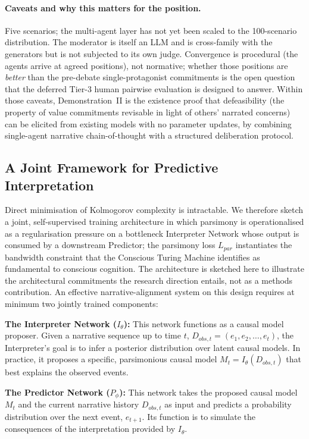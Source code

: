 \documentclass{article}
\theoremstyle{plain}
\theoremstyle{definition}
\theoremstyle{remark}
\begin{document}
\paragraph{Caveats and why this matters for the position.} Five scenarios; the multi-agent layer has not yet been scaled to the 100-scenario distribution. The moderator is itself an LLM and is cross-family with the generators but is not subjected to its own judge. Convergence is procedural (the agents arrive at agreed positions), not normative; whether those positions are \emph{better} than the pre-debate single-protagonist commitments is the open question that the deferred Tier-3 human pairwise evaluation is designed to answer. Within those caveats, Demonstration~II is the existence proof that defeasibility (the property of value commitments revisable in light of others' narrated concerns) can be elicited from existing models with no parameter updates, by combining single-agent narrative chain-of-thought with a structured deliberation protocol.

\subsection{A Joint Framework for Predictive Interpretation}
\label{sec:joint}

Direct minimisation of Kolmogorov complexity is intractable. We therefore sketch a joint, self-supervised training architecture in which parsimony is operationalised as a regularisation pressure on a bottleneck Interpreter Network whose output is consumed by a downstream Predictor; the parsimony loss $L_{par}$ instantiates the bandwidth constraint that the Conscious Turing Machine \citep{blum22, blum24} identifies as fundamental to conscious cognition. The architecture is sketched here to illustrate the architectural commitments the research direction entails, not as a methods contribution. An effective narrative-alignment system on this design requires at minimum two jointly trained components:

\textbf{The Interpreter Network ($I_\theta$):} This network functions as a causal model proposer. Given a narrative sequence up to time $t$, $D_{obs, t} = (e_1, e_2, \dots, e_t)$, the Interpreter's goal is to infer a posterior distribution over latent causal models. In practice, it proposes a specific, parsimonious causal model $M_t = I_\theta(D_{obs, t})$ that best explains the observed events.

\textbf{The Predictor Network ($P_\phi$):} This network takes the proposed causal model $M_t$ and the current narrative history $D_{obs, t}$ as input and predicts a probability distribution over the next event, $e_{t+1}$. Its function is to simulate the consequences of the interpretation provided by $I_\theta$.
\end{document}
